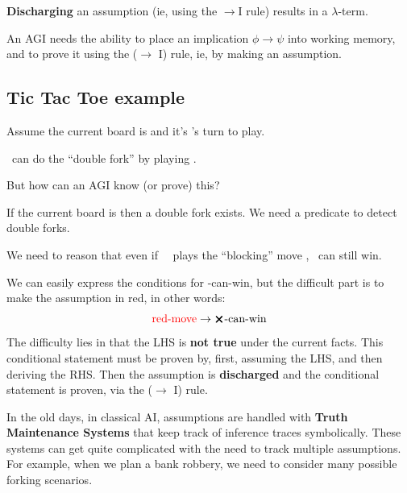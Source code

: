 \textbf{Discharging} an assumption (ie, using the $\rightarrow$I rule) results in a $\lambda$-term.

An AGI needs the ability to place an implication $\phi \rightarrow \psi$ into working memory, and to prove it using the ($\rightarrow$ I) rule, ie, by making an assumption.

\subsection{Tic Tac Toe example}

Assume the current board is
 and it's \bX's turn to play.

\bX \ can do the ``double fork'' by playing
.

But how can an AGI know (or prove) this?

If the current board is 
  then a double fork exists.  We need a predicate to detect double forks.

We need to reason that even if \ \bO \ plays the ``blocking'' move
  , \bX \ can still win.

We can easily express the conditions for \bX-can-win, but the difficult part is to make the assumption in {\color{red}red}, in other words:
\begin{equation}
\mbox{{\color{red}red-move}} \rightarrow \mbox{$\pmb{\bm{\times}}$-can-win}
\end{equation}
The difficulty lies in that the LHS is \textbf{not true} under the current facts.  This conditional statement must be proven by, first, assuming the LHS, and then deriving the RHS.  Then the assumption is \textbf{discharged} and the conditional statement is proven, via the ($\rightarrow$ I) rule.

In the old days, in classical AI, assumptions are handled with \textbf{Truth Maintenance Systems} that keep track of inference traces symbolically.  These systems can get quite complicated with the need to track multiple assumptions.  For example, when we plan a bank robbery, we need to consider many possible forking scenarios.  


